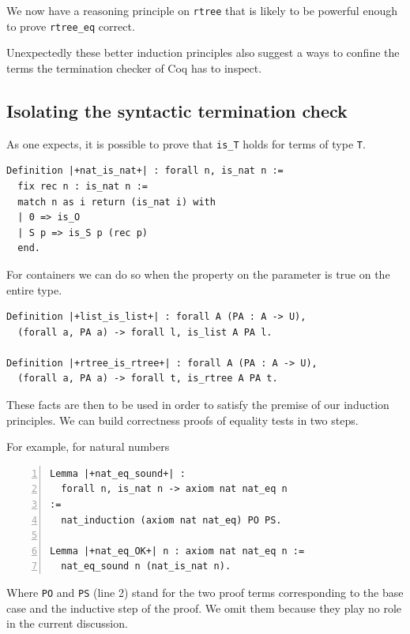 \documentclass[sigplan,10pt,review]{acmart}\settopmatter{printfolios=true,printccs=false,printacmref=false}
\begin{document}
\noindent
We now have a reasoning principle on \lstinline+rtree+ that is likely
to be powerful enough to prove \lstinline+rtree_eq+ correct.

Unexpectedly these better induction principles also suggest a ways
to confine the terms the termination checker of Coq has to inspect.

\subsection{Isolating the syntactic termination check} %
\label{section:idea:transparent}

As one expects, it is possible to prove that \lstinline+is_T+
holds for terms of type \lstinline+T+.

\begin{lstlisting}
Definition |+nat_is_nat+| : forall n, is_nat n :=
  fix rec n : is_nat n :=
  match n as i return (is_nat i) with
  | 0 => is_O
  | S p => is_S p (rec p)
  end.
\end{lstlisting}

\noindent
For containers we can do so when the property on the
parameter is true on the entire type.

\begin{lstlisting}
Definition |+list_is_list+| : forall A (PA : A -> U),
  (forall a, PA a) -> forall l, is_list A PA l.

Definition |+rtree_is_rtree+| : forall A (PA : A -> U),
  (forall a, PA a) -> forall t, is_rtree A PA t.
\end{lstlisting}

\noindent
These facts are then to be used in order to satisfy the
premise of our induction principles. We can build correctness
proofs of equality tests in two steps.

For example, for natural numbers

\begin{lstlisting}[numbers=left]
Lemma |+nat_eq_sound+| :
  forall n, is_nat n -> axiom nat nat_eq n
:=
  nat_induction (axiom nat nat_eq) PO PS.

Lemma |+nat_eq_OK+| n : axiom nat nat_eq n :=
  nat_eq_sound n (nat_is_nat n).
\end{lstlisting}

\noindent
Where \lstinline+PO+ and \lstinline+PS+ (line 2) stand for
the two proof terms corresponding to the base case and the inductive
step of the proof. We omit them because they play no role in the
current discussion.
\end{document}
